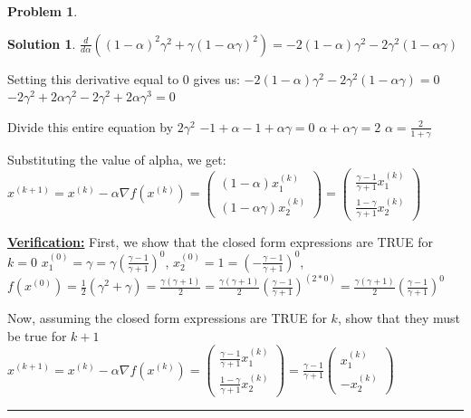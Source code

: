 \documentclass{article}
\theoremstyle{definition}
\newtheorem{problem}{Problem}
\def\fline{\rule{0.75\linewidth}{0.5pt}}
\newcommand{\finishline}{\begin{center}\fline\end{center}}
\newtheorem*{solution*}{Solution}
\newenvironment{solution}{\begin{solution*}}{{\finishline} \end{solution*}}
\begin{document}
\begin{problem}
\begin{solution}
$\frac{d}{d\alpha}((1 - \alpha)^2 \gamma^2 + \gamma (1 - \alpha \gamma)^2) = -2(1 - \alpha)\gamma^2 -2\gamma^2 (1 - \alpha \gamma)$ \newline 

Setting this derivative equal to 0 gives us: \newline 
$-2(1 - \alpha)\gamma^2 -2\gamma^2 (1 - \alpha \gamma) = 0$ \newline 
$-2\gamma^2 + 2\alpha \gamma^2 -2\gamma^2 + 2 \alpha \gamma^3 = 0$ \newline 

Divide this entire equation by $2\gamma^2$ \newline 
$-1 + \alpha - 1 + \alpha \gamma = 0$ \newline 
$\alpha + \alpha \gamma = 2$ \newline 
$\alpha = \frac{2}{1 + \gamma}$ \newline 

Substituting the value of alpha, we get: \newline
$x^{(k + 1)} = x^{(k)} - \alpha \nabla f(x^{(k)}) = \begin{pmatrix}
(1 - \alpha) x_1^{(k)} \\
(1 - \alpha \gamma) x_2^{(k)}
\end{pmatrix} = \begin{pmatrix}
\frac{\gamma - 1}{\gamma + 1} x_1^{(k)} \\
\frac{1 - \gamma}{\gamma + 1} x_2^{(k)}
\end{pmatrix}$ \newline 


\textbf{\underline{Verification:}} \newline 
First, we show that the closed form expressions are TRUE for $k = 0$ \newline
$x_1^{(0)} = \gamma = \gamma (\frac{\gamma - 1}{\gamma + 1})^0$, $x_2^{(0)} = 1 =(-\frac{\gamma - 1}{\gamma + 1})^0$, $f(x^{(0)}) = \frac{1}{2} (\gamma^2 + \gamma) = \frac{\gamma (\gamma + 1)}{2} = \frac{\gamma (\gamma + 1)}{2} (\frac{\gamma - 1}{\gamma + 1})^{(2 * 0)} = \frac{\gamma (\gamma + 1)}{2} (\frac{\gamma - 1}{\gamma + 1})^{0}$ \newline 


Now, assuming the closed form expressions are TRUE for $k$, show that they must be true for $k + 1$ \newline 
$x^{(k + 1)} = x^{(k)} - \alpha \nabla f(x^{(k)}) = \begin{pmatrix}
\frac{\gamma - 1}{\gamma + 1} x_1^{(k)} \\
\frac{1 - \gamma}{\gamma + 1} x_2^{(k)}
\end{pmatrix} = \frac{\gamma - 1}{\gamma + 1} \begin{pmatrix}
    x_1^{(k)} \\
    -x_2^{(k)}
\end{pmatrix}$


\end{solution}
\end{problem}
\end{document}
